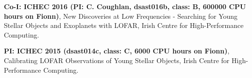 \begin{cvpubs}
  \cvpub
    {
      \begin{cvlist}
        \item {\textbf{Co-I: ICHEC 2016 (PI: C. Coughlan, dsast016b, class: B, 600000 CPU hours on Fionn)}, New Discoveries at Low Frequencies - Searching for Young Stellar Objects and Exoplanets with LOFAR, Irish Centre for High-Performance Computing.}
  \item {\textbf{PI: ICHEC 2015 (dsast014c, class: C, 6000 CPU hours on Fionn)}, Calibrating LOFAR Observations of Young Stellar Objects, Irish Centre for High-Performance Computing.}
      \end{cvlist}
    }
\vspace{-11pt}
\end{cvpubs}